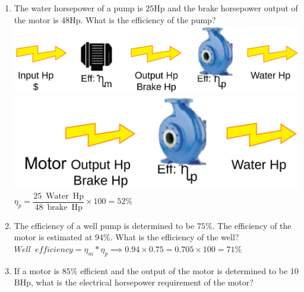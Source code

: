 \documentclass{article}
\begin{document}
\begin{enumerate}
\item The water horsepower of a pump is $25 \mathrm{Hp}$ and the brake horsepower output of the motor is $48 \mathrm{Hp}$. What is the efficiency of the pump?\\
  \vspace{0.2cm}
 \vspace{0.32cm}\includegraphics[scale=0.08]{PumpProblem}\\
 \vspace{0.2cm}
 \includegraphics[scale=0.4]{PumpingProblemPump}\\
 \vspace{0.2cm}
$\eta_p=\dfrac{25 \mathrm{\enspace Water \enspace Hp}}{48 \mathrm{\enspace brake \enspace Hp}} \times 100=\boxed{52 \%}$
  \vspace{0.4cm}


\item The efficiency of a well pump is determined to be $75 \%$. The efficiency of the motor is estimated at $94 \%$. What is the efficiency of the well?\\

 \vspace{0.2cm}
$Well \enspace efficiency=\eta_m * \eta_p \implies 0.94 \times 0.75=0.705 \times 100=\boxed{71 \%}$
 \vspace{0.2cm}

\item If a motor is $85 \%$ efficient and the output of the motor is determined to be 10
$\mathrm{BHp}$, what is the electrical horsepower requirement of the motor?


\end{enumerate}
\end{document}
